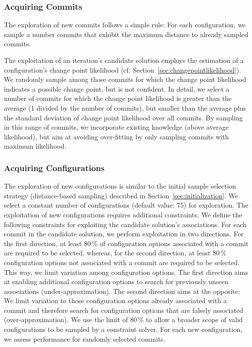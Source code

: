 \documentclass[sigconf]{acmart}
\begin{document}
 	\subsubsection{Acquiring Commits}
 	The exploration of new commits follows a simple rule: For each configuration, we sample a number commits that exhibit the maximum distance to already sampled commits. 
 	
 	The exploitation of an iteration's candidate solution employs the estimation of a configuration's change point likelihood (cf. Section~\ref{sec:changepointlikelihood}). We randomly sample among those commits for which the change point likelihood indicates a possible change point, but is not confident. In detail, we select a number of commits for which the change point likelihood is greater than the average (1 divided by the number of commits), but smaller than the average plus the standard deviation of change point likelihood over all commits. By sampling in this range of commits, we incorporate existing knowledge (above average likelihood), but aim at avoiding over-fitting by only sampling commits with maximum likelihood.
 	 
 	\subsubsection{Acquiring Configurations}
 	The exploration of new configurations is similar to the initial sample selection strategy (distance-based sampling) described in Section~\ref{sec:initialization}. We select a constant number of configurations (default value: 75) for exploration. The exploitation of new configurations requires additional constraints. We define the following constraints for exploiting the candidate solution's associations. For each commit in the candidate solution, we perform exploitation in two directions. For the first direction, at least 80\,\% of  configuration options associated with a commit are required to be selected, whereas, for the second direction, at least 80\,\% configuration options not associated with a commit are required to be selected. This way, we limit variation among configuration options. The first direction aims at enabling additional configuration options to search for previously unseen associations (under-approximation). The second direction aims at the opposite: We limit variation to those configuration options already associated with a commit and therefore search for configuration options that are falsely associated (over-approximation). We use the limit of 80\,\% to allow a broader scope of valid configurations to be sampled by a constraint solver. For each new configuration, we assess performance for randomly selected commits.
 	
\end{document}
